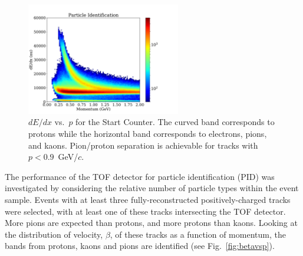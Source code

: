 \begin{figure}[!htb]
  \centering
  \includegraphics[width=0.6\textwidth]{figures/st_dedx_vs_p.pdf}
  \caption{$dE/dx$ vs.\ $p$ for the Start Counter.  The curved band
    corresponds to protons while the horizontal band corresponds to
    electrons, pions, and kaons. Pion/proton separation is achievable
    for tracks with $p < 0.9$~GeV/$c$.}\label{fig:ST_dEdx_vs_p}
\end{figure}

The performance of the TOF detector for particle identification (PID) was investigated by considering the relative number of
particle types within the event sample. Events with at least three fully-reconstructed positively-charged tracks were selected, with at least one of these tracks intersecting the TOF detector. More pions are expected than protons, and more protons than kaons. Looking at the distribution of velocity, $\beta$, of these tracks as a function of momentum, the bands from protons, kaons and pions are identified (see Fig.~\ref{fig:betavsp}). 

